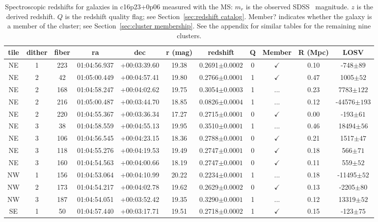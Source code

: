 \begin{table*}
	\centering \caption{Spectroscopic redshifts for galaxies in c16p23+0p06 measured with the MS: $m_r$ is the observed SDSS \sdssr\ magnitude. $z$ is the derived redshift. $Q$ is the redshift quality flag; see Section~\ref{sec:redshift catalog}. Member? indicates whether the galaxy is a member of the cluster; see Section~\ref{sec:cluster membership}. See the appendix for similar tables for the remaining nine clusters.}
	\begin{tabular}{ccccccccccc}
		\hline
		tile & dither & fiber & ra & dec & r (mag) & redshift & Q & Member & R (Mpc) & LOSV \\
		\hline \hline
		NE & 1 & 223 & 01:04:56.937 & +00:03:39.60 & 19.38 & 0.2691$\pm{0.0002}$ & 0 & $\checkmark$ & 0.10 & -748$\pm{89}$ \\
		NE & 2 & 42 & 01:05:00.449 & +00:04:57.41 & 19.80 & 0.2766$\pm{0.0001}$ & 1 & $\checkmark$ & 0.47 & 1005$\pm{52}$ \\
		NE & 2 & 168 & 01:04:58.247 & +00:04:02.62 & 19.75 & 0.3054$\pm{0.0003}$ & 1 & ... & 0.23 & 7783$\pm{122}$ \\
		NE & 2 & 216 & 01:05:00.487 & +00:03:44.70 & 18.85 & 0.0826$\pm{0.0004}$ & 1 & ... & 0.12 & -44576$\pm{193}$ \\
		NE & 2 & 220 & 01:04:55.367 & +00:03:36.34 & 17.27 & 0.2715$\pm{0.0001}$ & 0 & $\checkmark$ & 0.00 & -193$\pm{61}$ \\
		NE & 3 & 38 & 01:04:58.559 & +00:04:55.13 & 19.95 & 0.3510$\pm{0.0001}$ & 1 & ... & 0.46 & 18494$\pm{56}$ \\
		NE & 3 & 106 & 01:04:56.545 & +00:04:23.15 & 18.36 & 0.2788$\pm{0.0001}$ & 0 & $\checkmark$ & 0.21 & 1517$\pm{47}$ \\
		NE & 3 & 118 & 01:04:55.276 & +00:04:19.53 & 19.49 & 0.2747$\pm{0.0001}$ & 0 & $\checkmark$ & 0.18 & 566$\pm{71}$ \\
		NE & 3 & 160 & 01:04:54.563 & +00:04:00.66 & 18.19 & 0.2747$\pm{0.0001}$ & 0 & $\checkmark$ & 0.11 & 559$\pm{52}$ \\
		NW & 1 & 156 & 01:04:53.064 & +00:04:10.99 & 20.22 & 0.2234$\pm{0.0001}$ & 1 & ... & 0.18 & -11495$\pm{52}$ \\
		NW & 2 & 173 & 01:04:54.217 & +00:04:02.78 & 19.62 & 0.2629$\pm{0.0002}$ & 0 & $\checkmark$ & 0.13 & -2205$\pm{80}$ \\
		NW & 3 & 187 & 01:04:54.051 & +00:03:52.42 & 19.35 & 0.3290$\pm{0.0001}$ & 1 & ... & 0.12 & 13319$\pm{52}$ \\
		SE & 1 & 50 & 01:04:57.440 & +00:03:17.71 & 19.51 & 0.2718$\pm{0.0002}$ & 1 & $\checkmark$ & 0.15 & -123$\pm{75}$ \\

\end{tabular}
\end{table*}
